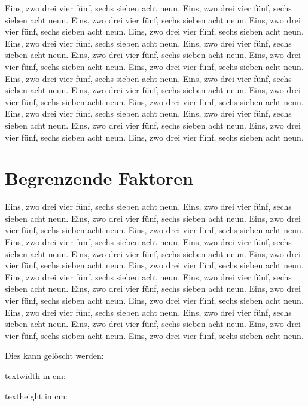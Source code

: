 \documentclass[12pt,a4paper]{article}
\begin{document}
Eins, zwo drei vier fünf, sechs sieben acht neun.
Eins, zwo drei vier fünf, sechs sieben acht neun.
Eins, zwo drei vier fünf, sechs sieben acht neun.
Eins, zwo drei vier fünf, sechs sieben acht neun.
Eins, zwo drei vier fünf, sechs sieben acht neun.
Eins, zwo drei vier fünf, sechs sieben acht neun.
Eins, zwo drei vier fünf, sechs sieben acht neun.
Eins, zwo drei vier fünf, sechs sieben acht neun.
Eins, zwo drei vier fünf, sechs sieben acht neun.
Eins, zwo drei vier fünf, sechs sieben acht neun.
Eins, zwo drei vier fünf, sechs sieben acht neun.
Eins, zwo drei vier fünf, sechs sieben acht neun.
Eins, zwo drei vier fünf, sechs sieben acht neun.
Eins, zwo drei vier fünf, sechs sieben acht neun.
Eins, zwo drei vier fünf, sechs sieben acht neun.
Eins, zwo drei vier fünf, sechs sieben acht neun.
Eins, zwo drei vier fünf, sechs sieben acht neun.
Eins, zwo drei vier fünf, sechs sieben acht neun.
Eins, zwo drei vier fünf, sechs sieben acht neun.
Eins, zwo drei vier fünf, sechs sieben acht neun.

\section{Begrenzende Faktoren}

Eins, zwo drei vier fünf, sechs sieben acht neun.
Eins, zwo drei vier fünf, sechs sieben acht neun.
Eins, zwo drei vier fünf, sechs sieben acht neun.
Eins, zwo drei vier fünf, sechs sieben acht neun.
Eins, zwo drei vier fünf, sechs sieben acht neun.
Eins, zwo drei vier fünf, sechs sieben acht neun.
Eins, zwo drei vier fünf, sechs sieben acht neun.
Eins, zwo drei vier fünf, sechs sieben acht neun.
Eins, zwo drei vier fünf, sechs sieben acht neun.
Eins, zwo drei vier fünf, sechs sieben acht neun.
Eins, zwo drei vier fünf, sechs sieben acht neun.
Eins, zwo drei vier fünf, sechs sieben acht neun.
Eins, zwo drei vier fünf, sechs sieben acht neun.
Eins, zwo drei vier fünf, sechs sieben acht neun.
Eins, zwo drei vier fünf, sechs sieben acht neun.
Eins, zwo drei vier fünf, sechs sieben acht neun.
Eins, zwo drei vier fünf, sechs sieben acht neun.
Eins, zwo drei vier fünf, sechs sieben acht neun.
Eins, zwo drei vier fünf, sechs sieben acht neun.
Eins, zwo drei vier fünf, sechs sieben acht neun.

\noindent Dies kann gelöscht werden:

\noindent textwidth in cm: \prntlen{\textwidth}

\noindent textheight in cm: \prntlen{\textheight}
\end{document}
